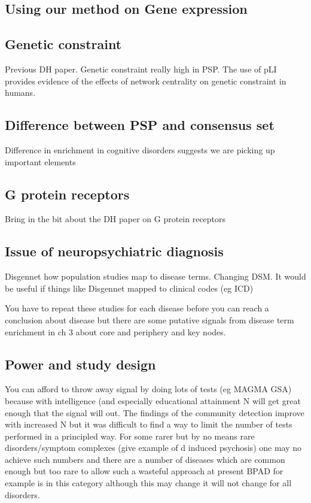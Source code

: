  \subsection{Using our method on Gene expression}
 \label{sec:discussion using our method on gene expression}
 \subsection{Genetic constraint}
 Previous DH paper. Genetic constraint really high in PSP. The use of pLI provides evidence of the effects of network centrality on genetic constraint in humans.
 
 \subsection{Difference between PSP and consensus set}
 Difference in enrichment in cognitive disorders suggests we are picking up important elements
 
 \subsection{G protein receptors}
 Bring in the bit about the DH paper on G protein receptors
 
 
 
 \subsection{Issue of neuropsychiatric diagnosis}
 Disgennet how population studies map to disease terms. Changing DSM. It would be useful if things like Disgennet mapped to clinical codes (eg ICD) 
 
 You have to repeat these studies for each disease before you can reach a conclusion about disease but there are some putative signals from disease term enrichment in ch 3 about core and periphery and key nodes. 
 
 \subsection{Power and study design}
 
 You can afford to throw away signal by doing lots of tests (eg MAGMA GSA) because with intelligence (and especially educational attainment N will get great enough that the signal will out. The findings of the community detection improve with increased N but it was difficult to find a way to limit the number of tests performed in a principled way. For some rarer but by no means rare disorders/symptom complexes (give example of d induced psychosis) one may no achieve such numbers and there are a number of diseases which are common enough but too rare to allow such a wasteful approach at present BPAD for example is in this category although this may change it will not change for all disorders.
 

